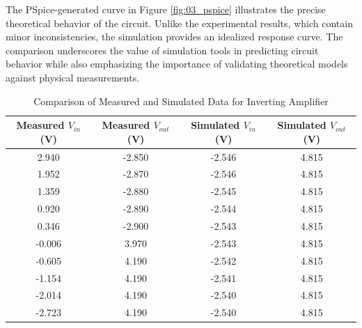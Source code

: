\documentclass[12pt]{article}
\begin{document}
The PSpice-generated curve in Figure \ref{fig:03_pspice} illustrates the precise theoretical behavior of the circuit. Unlike the experimental results, which contain minor inconsistencies, the simulation provides an idealized response curve. The comparison underscores the value of simulation tools in predicting circuit behavior while also emphasizing the importance of validating theoretical models against physical measurements.
\begin{table}[H]
	\centering
	\begin{tabular}{|c|c|c|c|}
		\hline
		\textbf{Measured $V_{in}$ (V)} & \textbf{Measured $V_{out}$ (V)} & \textbf{Simulated $V_{in}$ (V)} & \textbf{Simulated $V_{out}$ (V)} \\
		\hline
		2.940                          & -2.850                          & -2.546                          & 4.815                            \\
		1.952                          & -2.870                          & -2.546                          & 4.815                            \\
		1.359                          & -2.880                          & -2.545                          & 4.815                            \\
		0.920                          & -2.890                          & -2.544                          & 4.815                            \\
		0.346                          & -2.900                          & -2.543                          & 4.815                            \\
		-0.006                         & 3.970                           & -2.543                          & 4.815                            \\
		-0.605                         & 4.190                           & -2.542                          & 4.815                            \\
		-1.154                         & 4.190                           & -2.541                          & 4.815                            \\
		-2.014                         & 4.190                           & -2.540                          & 4.815                            \\
		-2.723                         & 4.190                           & -2.540                          & 4.815                            \\
		\hline
	\end{tabular}
	\caption{Comparison of Measured and Simulated Data for Inverting Amplifier}
	\label{tab:inverting_amp_comparison}
\end{table}
\end{document}
